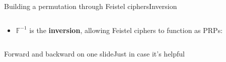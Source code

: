 \documentclass[aspectratio=169, lualatex, handout]{beamer}
\begin{document}
\begin{frame}{Building a permutation through Feistel ciphers}{Inversion}
	\begin{columns}[c]
		\begin{column}{0.5\textwidth}
			\begin{itemize}[<+->]
				\item $\mathbb{F}^{-1}$ is the \textbf{inversion}, allowing Feistel ciphers to function as PRPs:
				      \begin{center}
				      \end{center}
			\end{itemize}
		\end{column}
		\begin{column}{0.5\textwidth}
		\end{column}
	\end{columns}
\end{frame}

\begin{frame}{Forward and backward on one slide}{Just in case it's helpful}
	\begin{columns}[c]
		\begin{column}{0.5\textwidth}
			\begin{center}
			\end{center}
		\end{column}
		\begin{column}{0.5\textwidth}
			\begin{center}
			\end{center}
		\end{column}
	\end{columns}
\end{frame}
\end{document}

